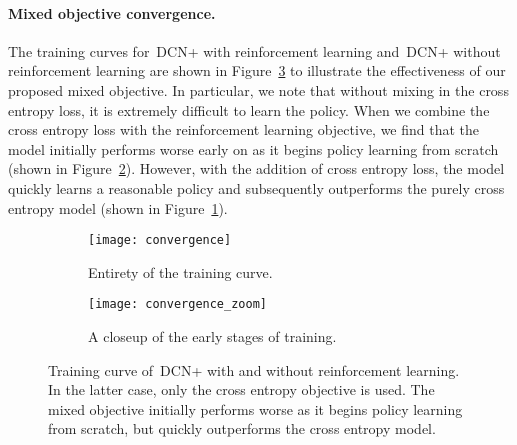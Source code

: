 \documentclass{article} \usepackage{iclr2018_conference,times}
\newcommand{\modelname}{DCN+\xspace}
\begin{document}
\paragraph{Mixed objective convergence.}
The training curves for~\modelname with reinforcement learning and~\modelname without reinforcement learning are shown in Figure~\ref{fig:rl_curve} to illustrate the effectiveness of our proposed mixed objective.
In particular, we note that without mixing in the cross entropy loss, it is extremely difficult to learn the policy.
When we combine the cross entropy loss with the reinforcement learning objective, we find that the model initially performs worse early on as it begins policy learning from scratch (shown in Figure~\ref{fig:rl_curve_zoom}).
However, with the addition of cross entropy loss, the model quickly learns a reasonable policy and subsequently outperforms the purely cross entropy model (shown in Figure~\ref{fig:rl_curve_whole}).

\begin{figure}
\centering
\begin{subfigure}{.5\textwidth}
  \centering
  \texttt{[image: convergence]}
  \caption{Entirety of the training curve.}
  \label{fig:rl_curve_whole}
\end{subfigure}\begin{subfigure}{.5\textwidth}
  \centering
  \texttt{[image: convergence\_zoom]}
  \caption{A closeup of the early stages of training.}
  \label{fig:rl_curve_zoom}
\end{subfigure}
\caption{
Training curve of~\modelname with and without reinforcement learning.
In the latter case, only the cross entropy objective is used.
The mixed objective initially performs worse as it begins policy learning from scratch, but quickly outperforms the cross entropy model.
}
\label{fig:rl_curve}
\end{figure}
\end{document}
